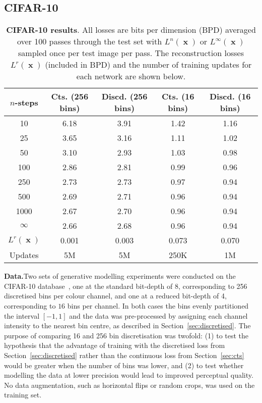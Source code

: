 \documentclass[11pt,table]{article}
\DeclareMathOperator{\x}{\mathbf{x}}
\newcommand{\0}[1]{\constvec{0}{#1}}
\newcommand{\1}[1]{\constvec{1}{#1}}
\begin{document}
\subsection{CIFAR-10}
\begin{table}[t!]
\centering
\begin{tabular}{ccccc}
\toprule
$n$-steps & Cts. (256 bins) & Discd. (256 bins) & Cts. (16 bins) & Discd. (16 bins)\\ 
\midrule
10  & 6.18 & 3.91 & 1.42 & 1.16\\ 
25  & 3.65 & 3.16 & 1.11 & 1.02\\ 
50  & 3.10 & 2.93 & 1.03 & 0.98\\ 
100 & 2.86 & 2.81 & 0.99 & 0.96 \\ 
250 & 2.73 & 2.73 & 0.97 & 0.94\\ 
500 & 2.69 & 2.71 & 0.96 & 0.94\\ 
1000& 2.67 & 2.70 & 0.96 & 0.94\\ 
\midrule
$\infty$ &  2.66 & 2.68 & 0.96 & 0.94\\ 
\bottomrule
\toprule
$L^r(\x)$ &  0.001 & 0.003 & 0.073 & 0.070\\ 
\midrule
Updates & 5M & 5M & 250K & 1M \\ 
\bottomrule
\end{tabular}
\caption{\textbf{CIFAR-10 results}. All losses are bits per dimension (BPD) averaged over 100 passes through the test set with $L^{n}(\x)$ or $L^{\infty}(\x)$ sampled once per test image per pass. The reconstruction losses $L^r(\x)$ (included in BPD) and the number of training updates for each network are shown below.}
\label{tab:cifar_results}
\end{table}

\textbf{Data.}\quad Two sets of generative modelling experiments were conducted on the CIFAR-10 database~\citep{Krizhevsky09learningmultiple}, one at the standard bit-depth of 8, corresponding to 256 discretised bins per colour channel, and one at a reduced bit-depth of 4, corresponding to $16$ bins per channel.
In both cases the bins evenly partitioned the interval $[-1,1]$ and the data was pre-processed by assigning each channel intensity to the nearest bin centre, as described in Section~\ref{sec:discretised}.
The purpose of comparing 16 and 256 bin discretisation was twofold: (1) to test the hypothesis that the advantage of training with the discretised loss from Section~\ref{sec:discretised} rather than the continuous loss from Section~\ref{sec:cts} would be greater when the number of bins was lower, and (2) to test whether modelling the data at lower precision would lead to improved perceptual quality.
No data augmentation, such as horizontal flips or random crops, was used on the training set.
\\
\end{document}
